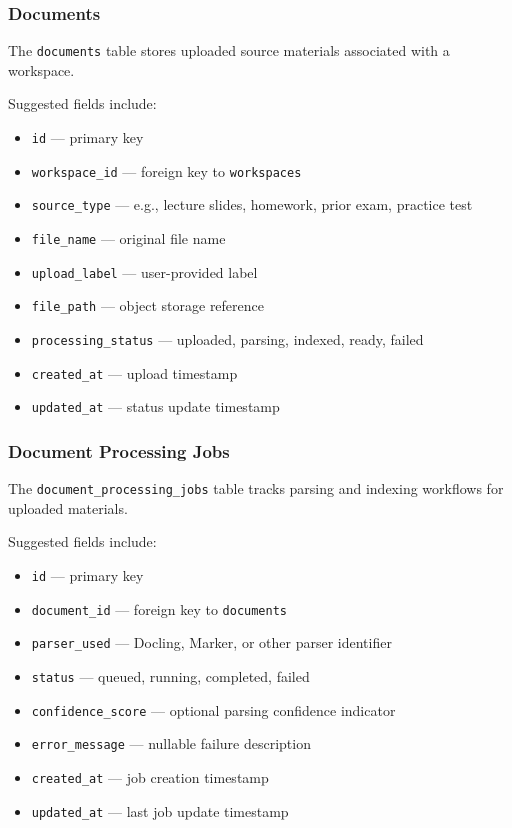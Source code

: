 \documentclass[11pt]{article}
\begin{document}
\subsubsection{Documents}
The \texttt{documents} table stores uploaded source materials associated with a workspace.

Suggested fields include:
\begin{itemize}
\item \texttt{id} --- primary key
\item \texttt{workspace\_id} --- foreign key to \texttt{workspaces}
\item \texttt{source\_type} --- e.g., lecture slides, homework, prior exam, practice test
\item \texttt{file\_name} --- original file name
\item \texttt{upload\_label} --- user-provided label
\item \texttt{file\_path} --- object storage reference
\item \texttt{processing\_status} --- uploaded, parsing, indexed, ready, failed
\item \texttt{created\_at} --- upload timestamp
\item \texttt{updated\_at} --- status update timestamp
\end{itemize}

\subsubsection{Document Processing Jobs}
The \texttt{document\_processing\_jobs} table tracks parsing and indexing workflows for uploaded materials.

Suggested fields include:
\begin{itemize}
\item \texttt{id} --- primary key
\item \texttt{document\_id} --- foreign key to \texttt{documents}
\item \texttt{parser\_used} --- Docling, Marker, or other parser identifier
\item \texttt{status} --- queued, running, completed, failed
\item \texttt{confidence\_score} --- optional parsing confidence indicator
\item \texttt{error\_message} --- nullable failure description
\item \texttt{created\_at} --- job creation timestamp
\item \texttt{updated\_at} --- last job update timestamp
\end{itemize}
\end{document}
